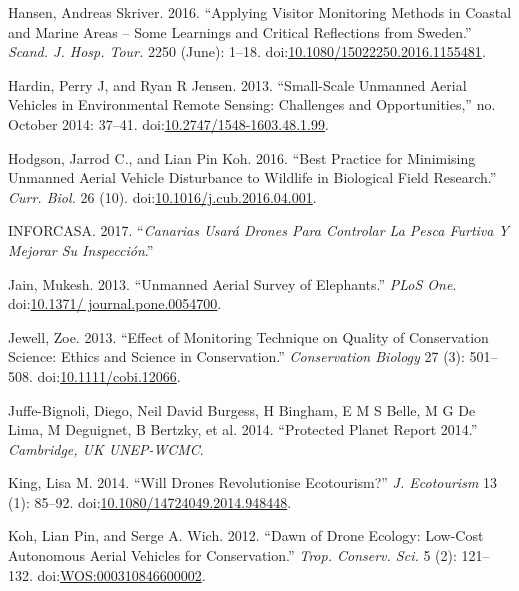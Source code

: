 \documentclass[]{interact}
\theoremstyle{plain}%
\theoremstyle{definition}
\theoremstyle{remark}
\begin{document}
\hypertarget{ref-hansen_applying_2016}{}
Hansen, Andreas Skriver. 2016. ``Applying Visitor Monitoring Methods in
Coastal and Marine Areas -- Some Learnings and Critical Reflections from
Sweden.'' \emph{Scand. J. Hosp. Tour.} 2250 (June): 1--18.
doi:\href{https://doi.org/10.1080/15022250.2016.1155481}{10.1080/15022250.2016.1155481}.

\hypertarget{ref-hardin_small-scale_2013}{}
Hardin, Perry J, and Ryan R Jensen. 2013. ``Small-Scale Unmanned Aerial
Vehicles in Environmental Remote Sensing: Challenges and
Opportunities,'' no. October 2014: 37--41.
doi:\href{https://doi.org/10.2747/1548-1603.48.1.99}{10.2747/1548-1603.48.1.99}.

\hypertarget{ref-hodgson_best_2016}{}
Hodgson, Jarrod C., and Lian Pin Koh. 2016. ``Best Practice for
Minimising Unmanned Aerial Vehicle Disturbance to Wildlife in Biological
Field Research.'' \emph{Curr. Biol.} 26 (10).
doi:\href{https://doi.org/10.1016/j.cub.2016.04.001}{10.1016/j.cub.2016.04.001}.

\hypertarget{ref-Canarias2017}{}
INFORCASA. 2017. ``\emph{Canarias Usará Drones Para Controlar La Pesca
Furtiva Y Mejorar Su Inspección}.''

\hypertarget{ref-jain_unmanned_2013}{}
Jain, Mukesh. 2013. ``Unmanned Aerial Survey of Elephants.'' \emph{PLoS
One}.
doi:\href{https://doi.org/10.1371/\%20journal.pone.0054700}{10.1371/ journal.pone.0054700}.

\hypertarget{ref-jewell_effect_2013}{}
Jewell, Zoe. 2013. ``Effect of Monitoring Technique on Quality of
Conservation Science: Ethics and Science in Conservation.''
\emph{Conservation Biology} 27 (3): 501--508.
doi:\href{https://doi.org/10.1111/cobi.12066}{10.1111/cobi.12066}.

\hypertarget{ref-juffe-bignoli_protected_2014}{}
Juffe-Bignoli, Diego, Neil David Burgess, H Bingham, E M S Belle, M G De
Lima, M Deguignet, B Bertzky, et al. 2014. ``Protected Planet Report
2014.'' \emph{Cambridge, UK UNEP-WCMC}.

\hypertarget{ref-king_will_2014}{}
King, Lisa M. 2014. ``Will Drones Revolutionise Ecotourism?'' \emph{J.
Ecotourism} 13 (1): 85--92.
doi:\href{https://doi.org/10.1080/14724049.2014.948448}{10.1080/14724049.2014.948448}.

\hypertarget{ref-koh_dawn_2012}{}
Koh, Lian Pin, and Serge A. Wich. 2012. ``Dawn of Drone Ecology:
Low-Cost Autonomous Aerial Vehicles for Conservation.'' \emph{Trop.
Conserv. Sci.} 5 (2): 121--132.
doi:\href{https://doi.org/WOS:000310846600002}{WOS:000310846600002}.
\end{document}
